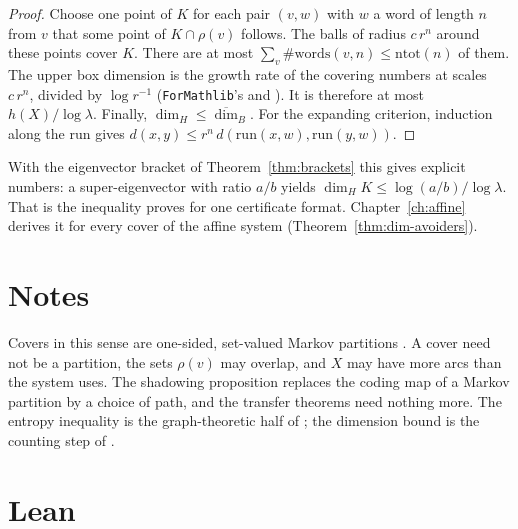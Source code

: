 \begin{proof}
Choose one point of \(K\) for each pair \((v,w)\) with \(w\) a word of length \(n\) from \(v\)
that some point of \(K\cap\rho(v)\) follows. The balls of radius \(c\,r^n\) around these points
cover \(K\). There are at most \(\sum_v\#\mathrm{words}(v,n)\le\mathrm{ntot}(n)\) of them. The
upper box dimension is the growth rate of the covering numbers at scales \(c\,r^n\), divided by
\(\log r^{-1}\) (\texttt{ForMathlib}'s  and
). It is therefore at most \(h(X)/\log\lambda\). Finally,
\(\dim_H\le\overline{\dim}_B\). For the expanding criterion, induction along the run gives
\(d(x,y)\le r^{n}\,d(\mathrm{run}(x,w),\mathrm{run}(y,w))\).
\end{proof}

With the eigenvector bracket of Theorem~\ref{thm:brackets} this gives explicit numbers: a
super-eigenvector with ratio \(a/b\) yields \(\dim_H K\le\log(a/b)/\log\lambda\). That is the
inequality  proves for one certificate format.
Chapter~\ref{ch:affine} derives it for every cover of the affine system (Theorem~\ref{thm:dim-avoiders}).

\section*{Notes}

Covers in this sense are one-sided, set-valued Markov partitions \cite[§6.5]{LM95}. A cover
need not be a partition, the sets \(\rho(v)\) may overlap, and \(X\) may have more arcs than the
system uses. The shadowing proposition replaces the coding map of a Markov partition by a choice
of path, and the transfer theorems need nothing more. The entropy inequality is the
graph-theoretic half of \cite[Prop.~4.1.13, ch.~4]{LM95}; the dimension bound is the counting
step of \cite[§3.2]{Fal03}.

\section*{Lean}

